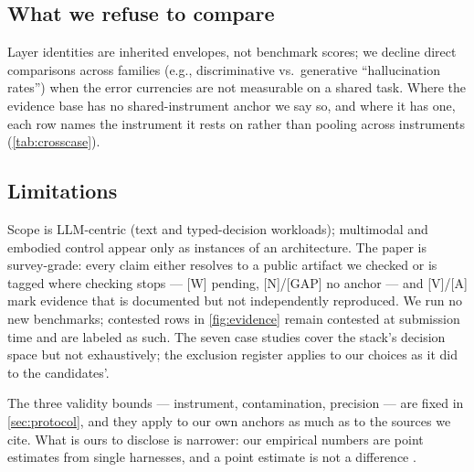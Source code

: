 \subsection{What we refuse to compare}
Layer identities are inherited envelopes, not benchmark scores; we decline direct comparisons
across families (e.g., discriminative vs.\ generative ``hallucination rates'') when the error
currencies are not measurable on a shared task. Where the evidence base has no shared-instrument
anchor we say so, and where it has one, each row names the instrument it rests on rather than pooling
across instruments (\cref{tab:crosscase}).

\subsection{Limitations}
Scope is LLM-centric (text and typed-decision workloads); multimodal and embodied control appear
only as instances of an architecture. The paper is survey-grade: every claim
either resolves to a public artifact we checked or is tagged where checking stops --- [W] pending,
[N]/[GAP] no anchor --- and [V]/[A] mark evidence that is documented but not independently
reproduced. We run no new benchmarks; contested rows in
\cref{fig:evidence} remain contested at submission time and are labeled as such. The seven case
studies cover the stack's decision space but not exhaustively; the exclusion register applies
to our choices as it did to the candidates'.

The three validity bounds --- instrument, contamination, precision --- are fixed in
\cref{sec:protocol}, and they apply to our own anchors as much as to the sources we cite. What is
ours to disclose is narrower: our empirical numbers are point estimates from single harnesses, and
a point estimate is not a difference \cite{errorbars2024,evalci2026}.


